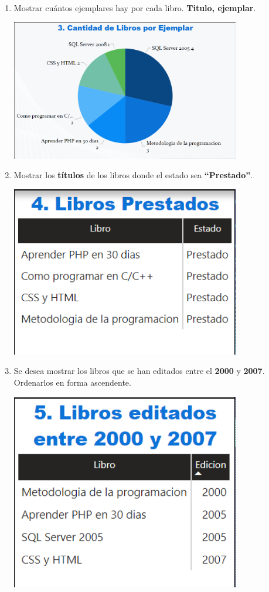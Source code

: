 \documentclass[12pt,letterpaper]{article}
\newcommand\tab[1][1cm]{\hspace*{#1}}
\begin{document}
\begin{enumerate}[\tab 1.]
        \item Mostrar cuántos ejemplares hay por cada libro. \textbf{Titulo, ejemplar}.
        \begin{center}
            \includegraphics[width=10cm]{./img/img15.png}
        \end{center}
        \item Mostrar los \textbf{títulos} de los libros donde el estado sea \textbf{“Prestado”}.
        \begin{center}
            \includegraphics[width=10cm]{./img/img16.png}
        \end{center}
        \item Se desea mostrar los libros que se han editados entre el \textbf{2000} y \textbf{2007}. Ordenarlos en forma ascendente.
        \begin{center}
            \includegraphics[width=10cm]{./img/img17.png}

\end{center}
\end{enumerate}
\end{document}
